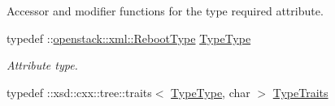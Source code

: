 Accessor and modifier functions for the type required attribute. \begin{DoxyCompactItemize}
\item 
\hypertarget{classopenstack_1_1xml_1_1Reboot_a96104a29e9e3d3fe3d5843380ebd6ab5}{
typedef ::\hyperlink{classopenstack_1_1xml_1_1RebootType}{openstack::xml::RebootType} \hyperlink{classopenstack_1_1xml_1_1Reboot_a96104a29e9e3d3fe3d5843380ebd6ab5}{TypeType}}
\label{classopenstack_1_1xml_1_1Reboot_a96104a29e9e3d3fe3d5843380ebd6ab5}

\begin{DoxyCompactList}\small\item\em Attribute type. \item\end{DoxyCompactList}\item 
\hypertarget{classopenstack_1_1xml_1_1Reboot_a147a7fdfb0ade2680e0ee1a6d0108b5e}{
typedef ::xsd::cxx::tree::traits$<$ \hyperlink{classopenstack_1_1xml_1_1RebootType}{TypeType}, char $>$ \hyperlink{classopenstack_1_1xml_1_1Reboot_a147a7fdfb0ade2680e0ee1a6d0108b5e}{TypeTraits}}
\label{classopenstack_1_1xml_1_1Reboot_a147a7fdfb0ade2680e0ee1a6d0108b5e}


\end{DoxyCompactItemize}
